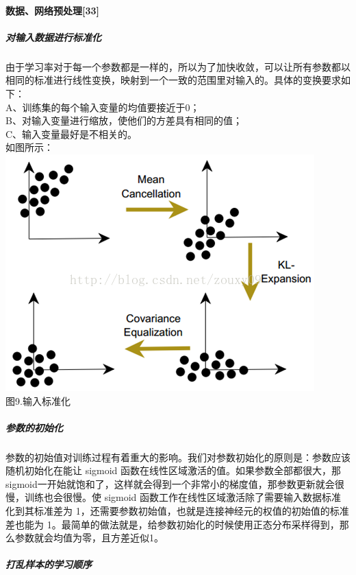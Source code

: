 \paragraph{数据、网络预处理{[}33{]}}\label{ux6570ux636eux7f51ux7edcux9884ux5904ux7406lecun2012}

\subparagraph{对输入数据进行标准化}\label{ux5bf9ux8f93ux5165ux6570ux636eux8fdbux884cux6807ux51c6ux5316}

由于学习率对于每一个参数都是一样的，所以为了加快收敛，可以让所有参数都以相同的标准进行线性变换，映射到一个一致的范围里对输入的。具体的变换要求如下：\\A、训练集的每个输入变量的均值要接近于0；\\B、对输入变量进行缩放，使他们的方差具有相同的值；\\C、输入变量最好是不相关的。\\如图所示：\\\includegraphics{picture/normalizing-the-inputs.png}\\图9.输入标准化

\subparagraph{参数的初始化}\label{ux53c2ux6570ux7684ux521dux59cbux5316}

参数的初始值对训练过程有着重大的影响。我们对参数初始化的原则是：参数应该随机初始化在能让
sigmoid
函数在线性区域激活的值。如果参数全部都很大，那sigmoid一开始就饱和了，这样就会得到一个非常小的梯度值，那参数更新就会很慢，训练也会很慢。使
sigmoid 函数工作在线性区域激活除了需要输入数据标准化到其标准差为
1，还需要参数初始值，也就是连接神经元的权值的初始值的标准差也能为
1。最简单的做法就是，给参数初始化的时候使用正态分布采样得到，那么参数就会均值为零，且方差近似1。

\subparagraph{打乱样本的学习顺序}\label{ux6253ux4e71ux6837ux672cux7684ux5b66ux4e60ux987aux5e8f}

